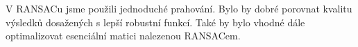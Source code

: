 \documentclass[11pt,oneside,a4paper,pdftex]{article}   %
\begin{document}
	V RANSACu jsme použili jednoduché prahování. Bylo by dobré porovnat kvalitu výsledků dosažených
	s lepší robustní funkcí. Také by bylo vhodné dále optimalizovat esenciální matici nalezenou
	RANSACem.





%
%
\printbibliography
%
\end{document}
